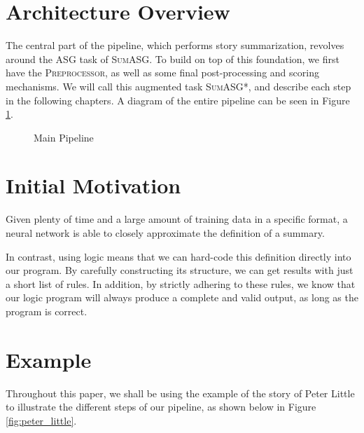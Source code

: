 \section{Architecture Overview}

The central part of the pipeline, which performs story summarization, revolves around the ASG task of \textsc{SumASG}. To build on top of this foundation, we first have the \textsc{Preprocessor}, as well as some final post-processing and scoring mechanisms. We will call this augmented task \textsc{SumASG*}, and describe each step in the following chapters. A diagram of the entire pipeline can be seen in Figure \ref{fig:main_pipeline}.

\begin{figure}[H]
\centering
{}
\caption{Main Pipeline}
\label{fig:main_pipeline}
\end{figure}

\section{Initial Motivation}

Given plenty of time and a large amount of training data in a specific format, a neural network is able to closely approximate the definition of a summary.

In contrast, using logic means that we can hard-code this definition directly into our program. By carefully constructing its structure, we can get results with just a short list of rules. In addition, by strictly adhering to these rules, we know that our logic program will always produce a complete and valid output, as long as the program is correct.

\section{Example}

Throughout this paper, we shall be using the example of the story of Peter Little to illustrate the different steps of our pipeline, as shown below in Figure \ref{fig:peter_little}.

